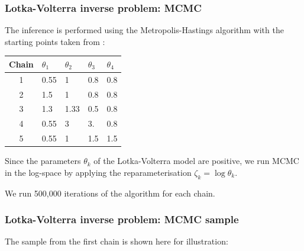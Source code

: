 \documentclass{beamer}
\begin{document}
\begin{frame}
\frametitle{Lotka-Volterra inverse problem: MCMC}

The inference is performed using the Metropolis-Hastings algorithm with the starting points taken from \cite{riabizOptimalThinningMCMC2022}:

\begin{table}[H]
\centering
\begin{tabularx}{0.5\textwidth}{c Y Y Y Y} 
 \hline
 Chain & $\theta_1$ & $\theta_2$ & $\theta_3$ & $\theta_4$ \\
  & 0.55 & 1    & 0.8 & 0.8 \\ 
 2 & 1.5  & 1    & 0.8 & 0.8 \\
 3 & 1.3  & 1.33 & 0.5 & 0.8 \\
 4 & 0.55 & 3    & 3.  & 0.8 \\
 5 & 0.55 & 1    & 1.5 & 1.5 \\
 \hline
\end{tabularx}
\end{table}

Since the parameters $\theta_k$ of the Lotka-Volterra model are positive, we run MCMC in the log-space by applying the reparameterisation $\zeta_k = \log \theta_k$. 

We run 500,000 iterations of the algorithm for each chain.

\end{frame}

\begin{frame}
\frametitle{Lotka-Volterra inverse problem: MCMC sample}

The sample from the first chain is shown here for illustration:

\begin{figure}[h]
\centering
{}
\end{figure}

\end{frame}
\end{document}
